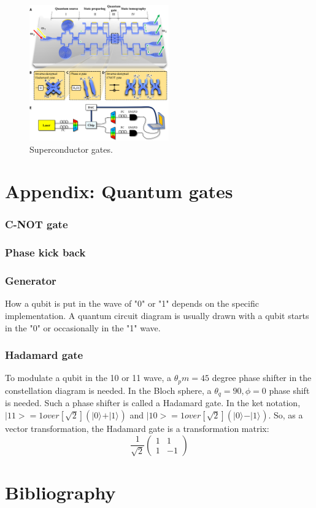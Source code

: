 \documentclass{book}
\newcommand{\keta}[2][]{\vert {#2} \rangle_{#1}}
\begin{document}
\begin{figure}[ht]
\includegraphics[width=6cm]{pic/superGates.jpg}
\caption{Superconductor gates.}
\label{superGates}
\end{figure}

\chapter{Appendix: Quantum gates}

\subsection{C-NOT gate}
\subsection{Phase kick back}

\subsection{Generator}
How a qubit is put in the wave of "0" or "1" depends on the specific implementation. A quantum circuit diagram is usually drawn with a qubit starts in the "0" or occasionally in the "1" wave.

\subsection{Hadamard gate}
To modulate a qubit in the 10 or 11 wave, a $\theta_pm = 45$ degree phase shifter in the constellation diagram is needed. In the Bloch sphere, a $\theta_q =90, \phi=0$ phase shift is needed. Such a phase shifter is called a Hadamard gate. In the ket notation, $|11> = 1 over [\sqrt 2] (\keta{0} + \keta{1})$ and $|10> = 1 over [\sqrt 2] (\keta{0} - \keta{1})$. So, as a vector transformation, the Hadamard gate is a transformation matrix:
\begin{equation}
    \frac 1 {\sqrt 2}
    \begin{pmatrix}
1 & 1 \\
1 & -1
\end{pmatrix}
\end{equation}

\chapter{Bibliography}

   

\backmatter
{}
\printindex
\end{document}
